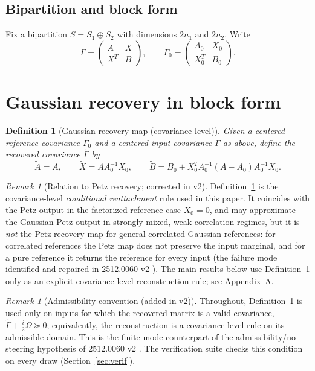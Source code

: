 \documentclass[11pt]{article}
\newtheorem{definition}[theorem]{Definition}
\theoremstyle{remark}
\newtheorem{remark}[theorem]{Remark}
\begin{document}
\subsection{Bipartition and block form}
Fix a bipartition $S = S_1 \oplus S_2$ with dimensions $2n_1$ and $2n_2$.
Write
\[
\Gamma = \begin{pmatrix} A & X \\ X^T & B \end{pmatrix},
\qquad
\Gamma_0 = \begin{pmatrix} A_0 & X_0 \\ X_0^T & B_0 \end{pmatrix}.
\]

\section{Gaussian recovery in block form}
\begin{definition}[Gaussian recovery map (covariance-level)]
\label{def:rec}
Given a centered reference covariance $\Gamma_0$ and a centered input
covariance $\Gamma$ as above, define the recovered covariance
$\tilde\Gamma$ by
\[
\tilde A = A, \qquad
\tilde X = A A_0^{-1} X_0, \qquad
\tilde B = B_0 + X_0^T A_0^{-1} (A - A_0) A_0^{-1} X_0 .
\]
\end{definition}

\begin{remark}[Relation to Petz recovery; corrected in v2]
\label{rem:petz}
Definition~\ref{def:rec} is the covariance-level \emph{conditional
reattachment} rule used in this paper. It coincides with the Petz output in
the factorized-reference case $X_0 = 0$, and may approximate the Gaussian
Petz output in strongly mixed, weak-correlation regimes, but it is \emph{not}
the Petz recovery map for general correlated Gaussian references: for
correlated references the Petz map does not preserve the input marginal, and
for a pure reference it returns the reference for every input (the failure
mode identified and repaired in 2512.0060 v2 \cite{S0060}). The main
results below use Definition~\ref{def:rec} only as an explicit
covariance-level reconstruction rule; see Appendix~A.
\end{remark}

\begin{remark}[Admissibility convention (added in v2)]
\label{rem:adm}
Throughout, Definition~\ref{def:rec} is used only on inputs for which the
recovered matrix is a valid covariance,
$\tilde\Gamma + \frac{i}{2}\Omega \succeq 0$; equivalently, the
reconstruction is a covariance-level rule on its admissible domain. This is
the finite-mode counterpart of the admissibility/no-steering hypothesis of
2512.0060 v2 \cite{S0060}. The verification suite checks this condition on
every draw (Section~\ref{sec:verif}).
\end{remark}
\end{document}
